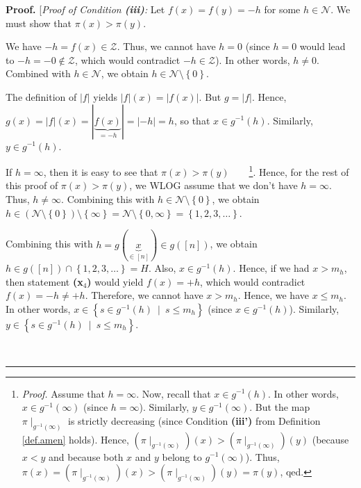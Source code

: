 \documentclass[numbers=enddot,12pt,final,onecolumn,notitlepage]{scrartcl}%
\theoremstyle{definition}
\newenvironment{proof}[1][Proof]{\noindent\textbf{#1.} }{\ \rule{0.5em}{0.5em}}
\newenvironment{verlong}{}{}
\begin{document}
\begin{verlong}
\begin{proof}
[\textit{Proof of Condition \textbf{(iii)}:} Let $f\left(  x\right)  =f\left(
y\right)  =-h$ for some $h\in\mathcal{N}$. We must show that $\pi\left(
x\right)  >\pi\left(  y\right)  $.

We have $-h=f\left(  x\right)  \in\mathcal{Z}$. Thus, we cannot have $h=0$
(since $h=0$ would lead to $-h=-0\notin\mathcal{Z}$, which would contradict
$-h\in\mathcal{Z}$). In other words, $h\neq0$. Combined with $h\in\mathcal{N}%
$, we obtain $h\in\mathcal{N}\setminus\left\{  0\right\}  $.

The definition of $\left\vert f\right\vert $ yields $\left\vert f\right\vert
\left(  x\right)  =\left\vert f\left(  x\right)  \right\vert $. But
$g=\left\vert f\right\vert $. Hence, $g\left(  x\right)  =\left\vert
f\right\vert \left(  x\right)  =\left\vert \underbrace{f\left(  x\right)
}_{=-h}\right\vert =\left\vert -h\right\vert =h$, so that $x\in g^{-1}\left(
h\right)  $. Similarly, $y\in g^{-1}\left(  h\right)  $.

If $h=\infty$, then it is easy to see that $\pi\left(  x\right)  >\pi\left(
y\right)  $\ \ \ \ \footnote{\textit{Proof.} Assume that $h=\infty$. Now,
recall that $x\in g^{-1}\left(  h\right)  $. In other words, $x\in
g^{-1}\left(  \infty\right)  $ (since $h=\infty$). Similarly, $y\in
g^{-1}\left(  \infty\right)  $. But the map $\pi\mid_{g^{-1}\left(
\infty\right)  }$ is strictly decreasing (since Condition \textbf{(iii')} from
Definition \ref{def.amen} holds). Hence, $\left(  \pi\mid_{g^{-1}\left(
\infty\right)  }\right)  \left(  x\right)  >\left(  \pi\mid_{g^{-1}\left(
\infty\right)  }\right)  \left(  y\right)  $ (because $x<y$ and because both
$x$ and $y$ belong to $g^{-1}\left(  \infty\right)  $). Thus, $\pi\left(
x\right)  =\left(  \pi\mid_{g^{-1}\left(  \infty\right)  }\right)  \left(
x\right)  >\left(  \pi\mid_{g^{-1}\left(  \infty\right)  }\right)  \left(
y\right)  =\pi\left(  y\right)  $, qed.}. Hence, for the rest of this proof of
$\pi\left(  x\right)  >\pi\left(  y\right)  $, we WLOG assume that we don't
have $h=\infty$. Thus, $h\neq\infty$. Combining this with $h\in\mathcal{N}%
\setminus\left\{  0\right\}  $, we obtain $h\in\left(  \mathcal{N}%
\setminus\left\{  0\right\}  \right)  \setminus\left\{  \infty\right\}
=\mathcal{N}\setminus\left\{  0,\infty\right\}  =\left\{  1,2,3,\ldots
\right\}  $.

Combining this with $h=g\left(  \underbrace{x}_{\in\left[  n\right]  }\right)
\in g\left(  \left[  n\right]  \right)  $, we obtain $h\in g\left(  \left[
n\right]  \right)  \cap\left\{  1,2,3,\ldots\right\}  =H$. Also, $x\in
g^{-1}\left(  h\right)  $. Hence, if we had $x>m_{h}$, then statement
\textbf{(x}$_{4}$\textbf{)} would yield $f\left(  x\right)  =+h$, which would
contradict $f\left(  x\right)  =-h\neq+h$. Therefore, we cannot have $x>m_{h}%
$. Hence, we have $x\leq m_{h}$. In other words, $x\in\left\{  s\in
g^{-1}\left(  h\right)  \ \mid\ s\leq m_{h}\right\}  $ (since $x\in
g^{-1}\left(  h\right)  $). Similarly, $y\in\left\{  s\in g^{-1}\left(
h\right)  \ \mid\ s\leq m_{h}\right\}  $.


\end{proof}
\end{verlong}
\end{document}
